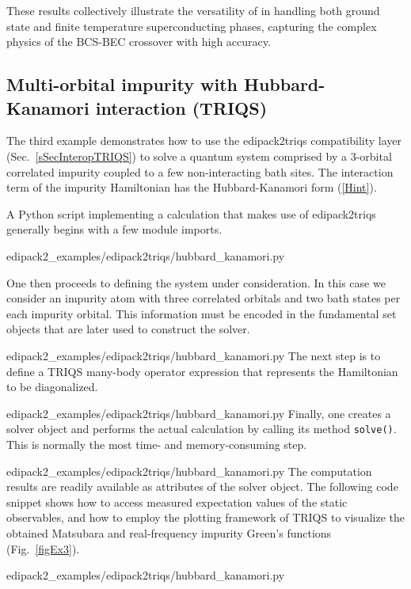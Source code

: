 \documentclass[edipack2.tex]{subfiles}
\begin{document}
These results collectively illustrate the versatility of \NAME in 
handling both ground state and finite temperature superconducting 
phases, capturing the complex physics of the BCS-BEC crossover with 
high accuracy.

\subsection{Multi-orbital impurity with Hubbard-Kanamori interaction (TRIQS)}
\label{SecExamplesTRIQS}

The third example demonstrates how to use the edipack2triqs compatibility
layer (Sec.~\ref{sSecInteropTRIQS}) to solve a quantum system comprised by a
3-orbital correlated impurity coupled to a few non-interacting bath sites.
The interaction term of the impurity Hamiltonian has the Hubbard-Kanamori
form (\ref{Hint}).

A Python script implementing a calculation that makes use of edipack2triqs
generally begins with a few module imports.

{edipack2_examples/edipack2triqs/hubbard_kanamori.py}

One then proceeds to defining the system under consideration. In this case we
consider an impurity atom with three correlated orbitals and two bath states
per each impurity orbital. This information must be encoded in the fundamental
set objects that are later used to construct the solver.

{edipack2_examples/edipack2triqs/hubbard_kanamori.py}
The next step is to define a TRIQS many-body operator expression that represents
the Hamiltonian to be diagonalized.

{edipack2_examples/edipack2triqs/hubbard_kanamori.py}
Finally, one creates a solver object and performs the actual calculation by
calling its method {\tt solve()}. This is normally the most time- and
memory-consuming step.

{edipack2_examples/edipack2triqs/hubbard_kanamori.py}
The computation results are readily available as attributes of the solver
object. The following code snippet shows how to access measured expectation
values of the static observables, and how to employ the plotting framework of
TRIQS to visualize the obtained Matsubara and real-frequency impurity Green's
functions (Fig.~\ref{figEx3}).

{edipack2_examples/edipack2triqs/hubbard_kanamori.py}
\end{document}
